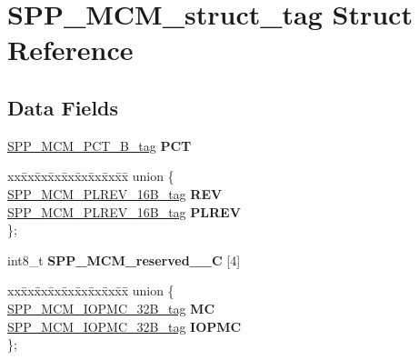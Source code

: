 \hypertarget{structSPP__MCM__struct__tag}{}\section{S\+P\+P\+\_\+\+M\+C\+M\+\_\+struct\+\_\+tag Struct Reference}
\label{structSPP__MCM__struct__tag}
\subsection*{Data Fields}
\begin{DoxyCompactItemize}
\item 
\mbox{\label{structSPP__MCM__struct__tag_ac9fc454134cf86c79e7208724a83ec25}} 
\mbox{\hyperlink{unionSPP__MCM__PCT__16B__tag}{S\+P\+P\+\_\+\+M\+C\+M\+\_\+\+P\+C\+T\+\_\+B\+\_\+tag}} {\bfseries P\+CT}
\item 
\mbox{\label{structSPP__MCM__struct__tag_a34a02bd78f71564791421ba56c949c15}} 
\begin{tabbing}
xx\=xx\=xx\=xx\=xx\=xx\=xx\=xx\=xx\=\kill
union \{\\
\>\mbox{\hyperlink{unionSPP__MCM__PLREV__16B__tag}{SPP\_MCM\_PLREV\_16B\_tag}} {\bfseries REV}\\
\>\mbox{\hyperlink{unionSPP__MCM__PLREV__16B__tag}{SPP\_MCM\_PLREV\_16B\_tag}} {\bfseries PLREV}\\
\}; \\

\end{tabbing}\item 
\mbox{\label{structSPP__MCM__struct__tag_a043113b8b66534e073f74692e2aaf1dd}} 
int8\+\_\+t {\bfseries S\+P\+P\+\_\+\+M\+C\+M\+\_\+reserved\+\_\+\_\+C} \mbox{[}4\mbox{]}
\item 
\mbox{\label{structSPP__MCM__struct__tag_afa5ee9613e42204e912cf1351f89beb8}} 
\begin{tabbing}
xx\=xx\=xx\=xx\=xx\=xx\=xx\=xx\=xx\=\kill
union \{\\
\>\mbox{\hyperlink{unionSPP__MCM__IOPMC__32B__tag}{SPP\_MCM\_IOPMC\_32B\_tag}} {\bfseries MC}\\
\>\mbox{\hyperlink{unionSPP__MCM__IOPMC__32B__tag}{SPP\_MCM\_IOPMC\_32B\_tag}} {\bfseries IOPMC}\\
\}; \\


\end{tabbing}
\end{DoxyCompactItemize}
